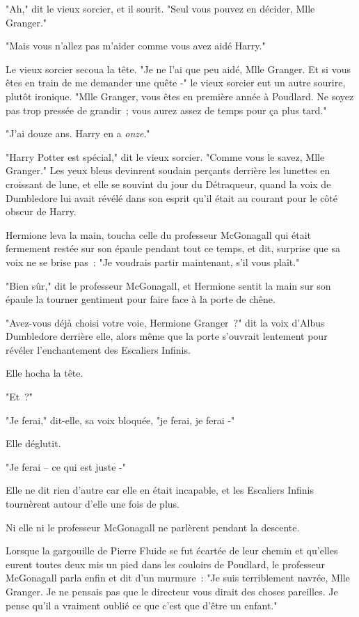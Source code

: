 "Ah," dit le vieux sorcier, et il sourit. "Seul vous pouvez en décider, Mlle Granger."

"Mais vous n'allez pas m'aider comme vous avez aidé Harry."

Le vieux sorcier secoua la tête. "Je ne l'ai que peu aidé, Mlle Granger. Et si vous êtes en train de me demander une quête -" le vieux sorcier eut un autre sourire, plutôt ironique. "Mlle Granger, vous êtes en première année à Poudlard. Ne soyez pas trop pressée de grandir~; vous aurez assez de temps pour ça plus tard."

"J'ai douze ans. Harry en a \emph{onze}."

"Harry Potter est spécial," dit le vieux sorcier. "Comme vous le savez, Mlle Granger." Les yeux bleus devinrent soudain perçants derrière les lunettes en croissant de lune, et elle se souvint du jour du Détraqueur, quand la voix de Dumbledore lui avait révélé dans son esprit qu'il était au courant pour le côté obscur de Harry.

Hermione leva la main, toucha celle du professeur McGonagall qui était fermement restée sur son épaule pendant tout ce temps, et dit, surprise que sa voix ne se brise pas~: "Je voudrais partir maintenant, s'il vous plaît."

"Bien sûr," dit le professeur McGonagall, et Hermione sentit la main sur son épaule la tourner gentiment pour faire face à la porte de chêne.

"Avez-vous déjà choisi votre voie, Hermione Granger~?" dit la voix d'Albus Dumbledore derrière elle, alors même que la porte s'ouvrait lentement pour révéler l'enchantement des Escaliers Infinis.

Elle hocha la tête.

"Et~?"

"Je ferai," dit-elle, sa voix bloquée, "je ferai, je ferai -"

Elle déglutit.

"Je ferai -- ce qui est juste -"

Elle ne dit rien d'autre car elle en était incapable, et les Escaliers Infinis tournèrent autour d'elle une fois de plus.

Ni elle ni le professeur McGonagall ne parlèrent pendant la descente.

Lorsque la gargouille de Pierre Fluide se fut écartée de leur chemin et qu'elles eurent toutes deux mis un pied dans les couloirs de Poudlard, le professeur McGonagall parla enfin et dit d'un murmure~: "Je suis terriblement navrée, Mlle Granger. Je ne pensais pas que le directeur vous dirait des choses pareilles. Je pense qu'il a vraiment oublié ce que c'est que d'être un enfant."

